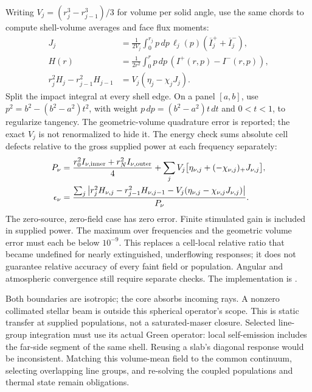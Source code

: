\documentclass[10pt,a4paper]{article}
\begin{document}
Writing $V_j=(r_j^3-r_{j-1}^3)/3$ for volume per solid angle, use the same
chords to compute shell-volume averages and face flux moments:
\begin{align}
 J_j&=\frac{1}{2V_j}\int_0^{r_j}p\,dp\,\ell_j(p)
          (\overline I_j^++\overline I_j^-),\nonumber\\
 H(r)&=\frac{1}{2r^2}\int_0^r p\,dp\,(I^+(r,p)-I^-(r,p)),\nonumber\\
 r_j^2H_j-r_{j-1}^2H_{j-1}&=V_j(\eta_j-\chi_jJ_j).
 \label{eq:spherical_average}
\end{align}
Split the impact integral at every shell edge. On a panel $[a,b]$, use
$p^2=b^2-(b^2-a^2)t^2$, with weight $p\,dp=(b^2-a^2)t\,dt$ and $0<t<1$,
to regularize tangency. The geometric-volume quadrature error is reported;
the exact $V_j$ is not renormalized to hide it.
The energy check sums absolute cell defects relative to the gross supplied
power at each frequency separately:
\begin{align}
 P_\nu&=\frac{r_0^2I_{\nu,\rm inner}+r_N^2I_{\nu,\rm outer}}{4}
       +\sum_j V_j\bigl[\eta_{\nu,j}+(-\chi_{\nu,j})_+J_{\nu,j}\bigr],\nonumber\\
 \epsilon_\nu&=\frac{\sum_j\left|
 r_j^2H_{\nu,j}-r_{j-1}^2H_{\nu,j-1}
 -V_j(\eta_{\nu,j}-\chi_{\nu,j}J_{\nu,j})\right|}{P_\nu}.
 \label{eq:spherical_energy_norm}
\end{align}
The zero-source, zero-field case has zero error. Finite stimulated gain is
included in supplied power. The maximum over frequencies and the geometric
volume error must each be below $10^{-9}$. This replaces a cell-local relative
ratio that became undefined for nearly extinguished, underflowing responses;
it does not guarantee relative accuracy of every faint field or population.
Angular and atmospheric convergence still require separate checks.
The implementation is
.

Both boundaries are isotropic; the core absorbs incoming rays. A nonzero
collimated stellar beam is outside this spherical operator's scope. This
is static transfer at supplied populations, not a saturated-maser closure.
Selected line-group integration must use its actual Green operator: local
self-emission includes the far-side segment of the same shell. Reusing a
slab's diagonal response would be inconsistent. Matching this volume-mean
field to the common continuum, selecting overlapping line groups, and
re-solving the coupled populations and thermal state remain obligations.
\end{document}
